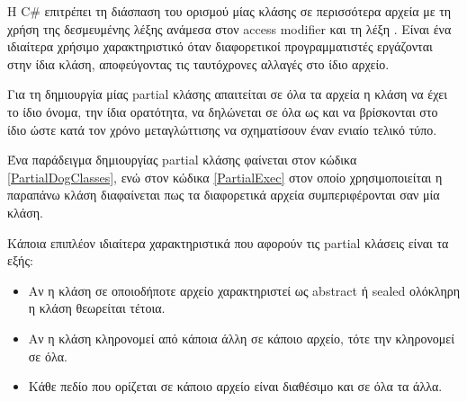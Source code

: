 H C\# επιτρέπει τη διάσπαση του ορισμού μίας κλάσης σε περισσότερα αρχεία με τη χρήση της δεσμευμένης λέξης  ανάμεσα στον access modifier και τη λέξη . Είναι ένα ιδιαίτερα χρήσιμο χαρακτηριστικό όταν διαφορετικοί προγραμματιστές εργάζονται στην ίδια κλάση, αποφεύγοντας τις ταυτόχρονες αλλαγές στο ίδιο αρχείο.

Για τη δημιουργία μίας partial κλάσης απαιτείται σε όλα τα αρχεία η κλάση να έχει το ίδιο όνομα, την ίδια ορατότητα, να δηλώνεται σε όλα ως  και να βρίσκονται στο ίδιο  ώστε κατά τον χρόνο μεταγλώττισης να σχηματίσουν έναν ενιαίο τελικό τύπο.



Ένα παράδειγμα δημιουργίας partial κλάσης φαίνεται στον κώδικα \ref{PartialDogClasses}, ενώ στον κώδικα \ref{PartialExec} στον οποίο χρησιμοποιείται η παραπάνω κλάση διαφαίνεται πως τα διαφορετικά αρχεία συμπεριφέρονται σαν μία κλάση.



Κάποια επιπλέον ιδιαίτερα χαρακτηριστικά που αφορούν τις partial κλάσεις είναι τα εξής:
\begin{itemize}
    \item Αν η κλάση σε οποιοδήποτε αρχείο χαρακτηριστεί ως abstract ή sealed ολόκληρη η κλάση θεωρείται τέτοια.
    \item Αν η κλάση κληρονομεί από κάποια άλλη σε κάποιο αρχείο, τότε την κληρονομεί σε όλα.
    \item Κάθε πεδίο που ορίζεται σε κάποιο αρχείο είναι διαθέσιμο και σε όλα τα άλλα.
\end{itemize}
\newpage